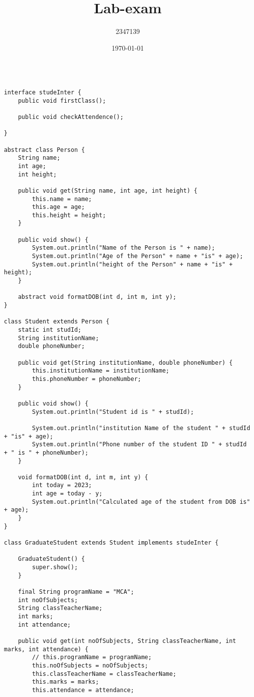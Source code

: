 \documentclass{article}
\title{Lab-exam}
\author{2347139}
\date{\today}
\begin{document}
\maketitle
\begin{lstlisting}
  
interface studeInter {
    public void firstClass();

    public void checkAttendence();

}

abstract class Person {
    String name;
    int age;
    int height;

    public void get(String name, int age, int height) {
        this.name = name;
        this.age = age;
        this.height = height;
    }

    public void show() {
        System.out.println("Name of the Person is " + name);
        System.out.println("Age of the Person" + name + "is" + age);
        System.out.println("height of the Person" + name + "is" + height);
    }

    abstract void formatDOB(int d, int m, int y);
}

class Student extends Person {
    static int studId;
    String institutionName;
    double phoneNumber;

    public void get(String institutionName, double phoneNumber) {
        this.institutionName = institutionName;
        this.phoneNumber = phoneNumber;
    }

    public void show() {
        System.out.println("Student id is " + studId);

        System.out.println("institution Name of the student " + studId + "is" + age);
        System.out.println("Phone number of the student ID " + studId + " is " + phoneNumber);
    }

    void formatDOB(int d, int m, int y) {
        int today = 2023;
        int age = today - y;
        System.out.println("Calculated age of the student from DOB is" + age);
    }
}

class GraduateStudent extends Student implements studeInter {

    GraduateStudent() {
        super.show();
    }

    final String programName = "MCA";
    int noOfSubjects;
    String classTeacherName;
    int marks;
    int attendance;

    public void get(int noOfSubjects, String classTeacherName, int marks, int attendance) {
        // this.programName = programName;
        this.noOfSubjects = noOfSubjects;
        this.classTeacherName = classTeacherName;
        this.marks = marks;
        this.attendance = attendance;


\end{lstlisting}
\end{document}
